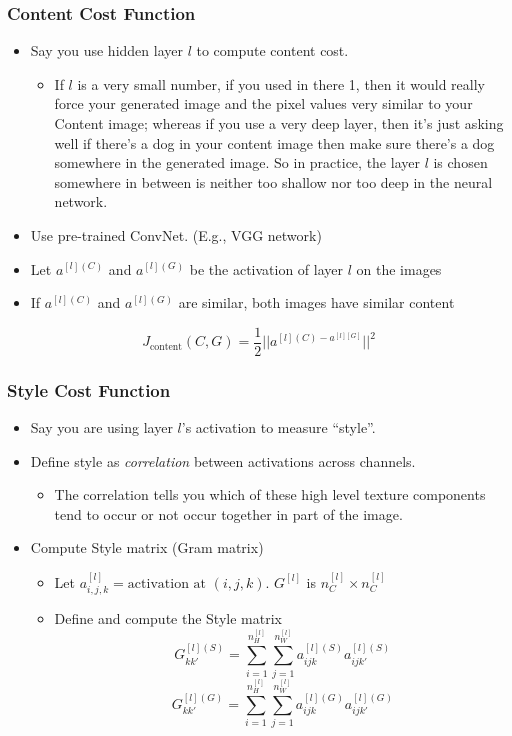 \documentclass[UTF8]{article}
\begin{document}
\subsubsection{Content Cost Function}
\begin{itemize}
    \item Say you use hidden layer $l$ to compute content cost.
    \begin{itemize}
        \item If $l$ is a very small number, if you used in there 1, then it would really force your generated
        image and the pixel values very similar to your Content image; whereas if you use a very deep
        layer, then it's just asking well if there's a dog in your content image then make sure there's a
        dog somewhere in the generated image. So in practice, the layer $l$ is chosen somewhere in between
        is neither too shallow nor too deep in the neural network.
    \end{itemize}
    \item Use pre-trained ConvNet. (E.g., VGG network)
    \item Let $a^{[l](C)}$ and $a^{[l](G)}$ be the activation of layer $l$ on the images
    \item If $a^{[l](C)}$ and $a^{[l](G)}$ are similar, both images have similar content
\end{itemize}

$$ J_{\text{content}}(C, G) = \frac{1}{2} ||a^{[l](C) - a^{[l][G]}}||^2 $$

\subsubsection{Style Cost Function}
\begin{itemize}
    \item Say you are using layer $l$'s activation to measure ``style''.
    \item Define style as \emph{correlation} between activations across channels.
    \begin{itemize}
        \item The correlation tells you which of these high level texture components tend to occur
        or not occur together in part of the image.
    \end{itemize}
    \item Compute Style matrix (Gram matrix)
    \begin{itemize}
        \item Let $a_{i,j,k}^{[l]} = \text{activation at } (i, j, k).$ \quad $G^{[l]}$ is $n_C^{[l]}
        \times n_C^{[l]}$
        \item Define and compute the Style matrix
        $$ G_{kk'}^{[l](S)} = \sum_{i=1}^{n_H^{[l]}} \sum_{j=1}^{n_W^{[l]}} a_{ijk}^{[l](S)}
        a_{ijk'}^{[l](S)} $$
        $$ G_{kk'}^{[l](G)} = \sum_{i=1}^{n_H^{[l]}} \sum_{j=1}^{n_W^{[l]}} a_{ijk}^{[l](G)}
        a_{ijk'}^{[l](G)} $$
    \end{itemize}
\end{itemize}
\end{document}
